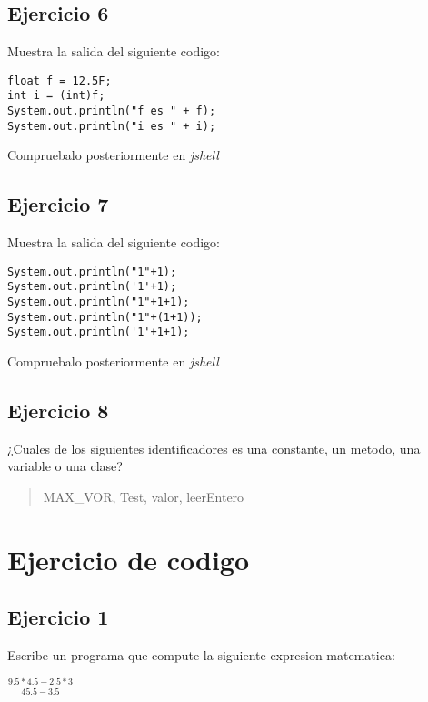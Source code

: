 \documentclass[4paper]{article}
\begin{document}
\subsection{Ejercicio 6}
Muestra la salida del siguiente codigo:
\begin{verbatim}
float f = 12.5F;
int i = (int)f;
System.out.println("f es " + f);
System.out.println("i es " + i);
\end{verbatim}
Compruebalo posteriormente en \emph{jshell}


\subsection{Ejercicio 7}
Muestra la salida del siguiente codigo:
\begin{verbatim}
System.out.println("1"+1);
System.out.println('1'+1);
System.out.println("1"+1+1);
System.out.println("1"+(1+1));
System.out.println('1'+1+1);
\end{verbatim}
Compruebalo posteriormente en \emph{jshell}

\subsection{Ejercicio 8}
¿Cuales de los siguientes identificadores es una constante, un metodo, una variable o una clase?
\begin{quote}
MAX\_VOR, Test, valor, leerEntero
\end{quote}


\section{Ejercicio de codigo}
\subsection{Ejercicio 1}
Escribe un programa que compute la siguiente expresion matematica:\\
\begin{center}
{\huge $\frac{9.5 * 4.5 - 2.5 * 3}{ 45.5 - 3.5}$}
\end{center}
\newpage
\end{document}
